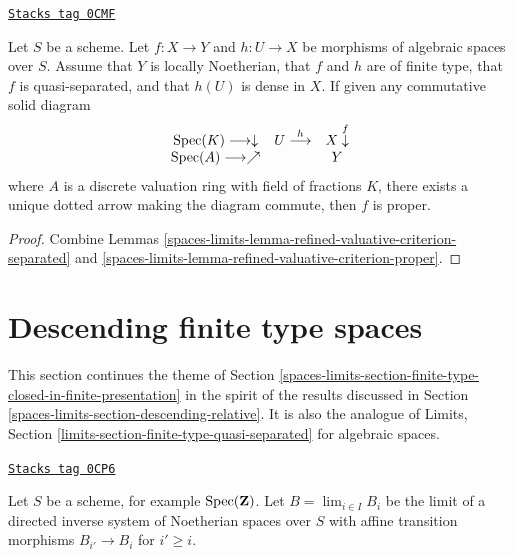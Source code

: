 \begin{lemma}
\label{spaces-limits-lemma-refined-valuative-criterion-universally-closed}
\href{https://stacks.math.columbia.edu/tag/0CMF}{\texttt{Stacks tag 0CMF}}

Let $S$ be a scheme.
Let $f : X \to Y$ and $h : U \to X$ be morphisms of algebraic spaces over $S$.
Assume that $Y$ is locally Noetherian, that $f$ and $h$ are of finite type,
that $f$ is quasi-separated, and
that $h(U)$ is dense in $X$. If given any commutative solid diagram
$$
\begin{array}{ccc}\operatorname{Spec}(K) \longrightarrow\downarrow & U \overset{h}{\longrightarrow} & X \overset{f}{\downarrow} \\ \operatorname{Spec}(A) \longrightarrow\nearrow &  & Y\end{array}
$$
where $A$ is a discrete valuation ring with field of fractions $K$, there
exists a unique dotted arrow making the diagram commute, then $f$ is proper.
\end{lemma}

\begin{proof}
Combine Lemmas \ref{spaces-limits-lemma-refined-valuative-criterion-separated} and
\ref{spaces-limits-lemma-refined-valuative-criterion-proper}.
\end{proof}

\section{Descending finite type spaces}
\label{spaces-limits-section-finite-type-quasi-separated}
This section continues the theme of
Section \ref{spaces-limits-section-finite-type-closed-in-finite-presentation}
in the spirit of the results discussed in
Section \ref{spaces-limits-section-descending-relative}.
It is also the analogue of
Limits, Section \ref{limits-section-finite-type-quasi-separated}
for algebraic spaces.

\begin{definition}
\label{spaces-limits-situation-limit-noetherian}
\href{https://stacks.math.columbia.edu/tag/0CP6}{\texttt{Stacks tag 0CP6}}

Let $S$ be a scheme, for example $\operatorname{Spec}(\mathbf{Z})$.
Let $B = \lim_{i \in I} B_i$ be the limit
of a directed inverse system of Noetherian spaces over $S$
with affine transition morphisms
$B_{i'} \to B_i$ for $i' \geq i$.
\end{definition}

